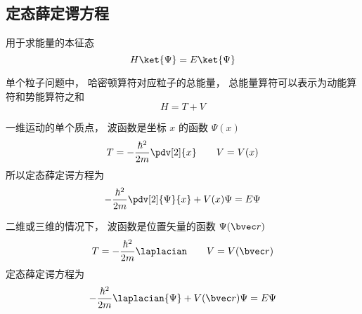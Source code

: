 

\subsection{定态薛定谔方程}
用于求能量的本征态
\begin{equation}
H \ket{\Psi} = E \ket{\Psi}
\end{equation}


单个粒子问题中， 哈密顿算符对应粒子的总能量， 总能量算符可以表示为动能算符和势能算符之和
\begin{equation}
H = T + V
\end{equation}

一维运动的单个质点， 波函数是坐标 $x$ 的函数 $\Psi(x)$
\begin{equation}
T = -\frac{\hbar^2}{2m} \pdv[2]{x} \qquad V = V(x)
\end{equation}
所以定态薛定谔方程为
\begin{equation}
-\frac{\hbar^2}{2m} \pdv[2]{\Psi}{x} + V(x)\Psi = E \Psi
\end{equation}

二维或三维的情况下， 波函数是位置矢量的函数 $\Psi(\bvec r)$
\begin{equation}
T = -\frac{\hbar^2}{2m} \laplacian \qquad V = V(\bvec r)
\end{equation}
定态薛定谔方程为
\begin{equation}
-\frac{\hbar^2}{2m} \laplacian {\Psi} + V(\bvec r)\Psi = E \Psi
\end{equation}
